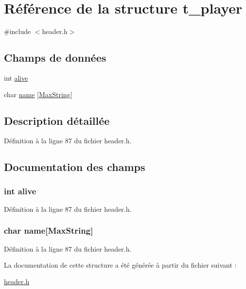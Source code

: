 \hypertarget{structt__player}{\section{Référence de la structure t\-\_\-player}
\label{structt__player}
}


{\ttfamily \#include $<$header.\-h$>$}

\subsection*{Champs de données}
\begin{DoxyCompactItemize}
\item 
int \hyperlink{structt__player_afaea7716a081e71f804e80c2d5a92390}{alive}
\item 
char \hyperlink{structt__player_ab27f28c5ead39031421706ddbbd1edea}{name} \mbox{[}\hyperlink{header_8h_ab154998a3a376095f3601bc35c5cf523}{Max\-String}\mbox{]}
\end{DoxyCompactItemize}


\subsection{Description détaillée}


Définition à la ligne 87 du fichier header.\-h.



\subsection{Documentation des champs}
\hypertarget{structt__player_afaea7716a081e71f804e80c2d5a92390}{
\subsubsection[{alive}]{\setlength{\rightskip}{0pt plus 5cm}int alive}}\label{structt__player_afaea7716a081e71f804e80c2d5a92390}


Définition à la ligne 87 du fichier header.\-h.

\hypertarget{structt__player_ab27f28c5ead39031421706ddbbd1edea}{
\subsubsection[{name}]{\setlength{\rightskip}{0pt plus 5cm}char name\mbox{[}{\bf Max\-String}\mbox{]}}}\label{structt__player_ab27f28c5ead39031421706ddbbd1edea}


Définition à la ligne 87 du fichier header.\-h.



La documentation de cette structure a été générée à partir du fichier suivant \-:\begin{DoxyCompactItemize}
\item 
\hyperlink{header_8h}{header.\-h}\end{DoxyCompactItemize}

